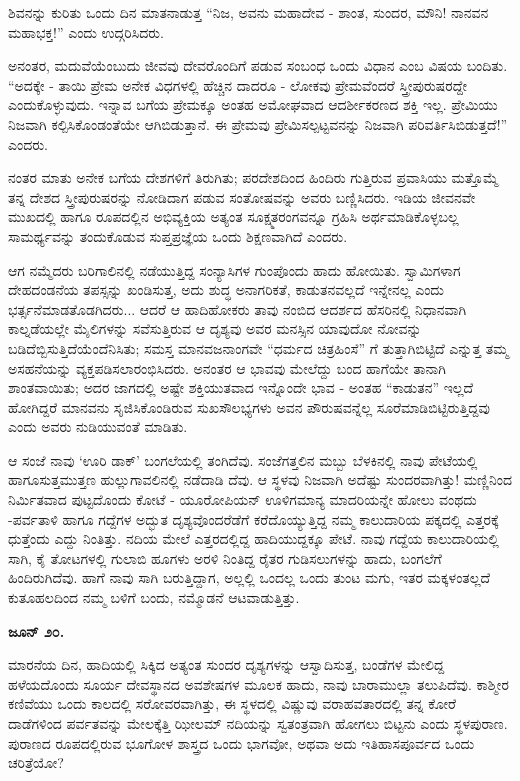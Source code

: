 ಶಿವನನ್ನು ಕುರಿತು ಒಂದು ದಿನ ಮಾತನಾಡುತ್ತ “ನಿಜ, ಅವನು ಮಹಾದೇವ - ಶಾಂತ, ಸುಂದರ, ಮೌನಿ! ನಾನವನ ಮಹಾಭಕ್ತ!” ಎಂದು ಉದ್ಗರಿಸಿದರು.

ಅನಂತರ, ಮದುವೆಯೆಂಬುದು ಜೀವವು ದೇವರೊಂದಿಗೆ ಪಡುವ ಸಂಬಂಧ ಒಂದು ವಿಧಾನ ಎಂಬ ವಿಷಯ ಬಂದಿತು. “ಅದಕ್ಕೇ - ತಾಯಿ ಪ್ರೇಮ ಅನೇಕ ವಿಧಗಳಲ್ಲಿ ಹೆಚ್ಚಿನ ದಾದರೂ - ಲೋಕವು ಪ್ರೇಮವೆಂದರೆ ಸ್ತ್ರೀಪುರುಷರದ್ದೇ ಎಂದುಕೊಳ್ಳುವುದು. ಇನ್ನಾವ ಬಗೆಯ ಪ್ರೇಮಕ್ಕೂ ಅಂತಹ ಅಮೋಘವಾದ ಆದರ್ಶೀಕರಣದ ಶಕ್ತಿ ಇಲ್ಲ. ಪ್ರೇಮಿಯು ನಿಜವಾಗಿ ಕಲ್ಪಿಸಿಕೊಂಡಂತೆಯೇ ಆಗಿಬಿಡುತ್ತಾನೆ. ಈ ಪ್ರೇಮವು ಪ್ರೇಮಿಸಲ್ಪಟ್ಟವನನ್ನು ನಿಜವಾಗಿ ಪರಿವರ್ತಿಸಿಬಿಡುತ್ತದೆ!” ಎಂದರು.

ನಂತರ ಮಾತು ಅನೇಕ ಬಗೆಯ ದೇಶಗಳಿಗೆ ತಿರುಗಿತು; ಪರದೇಶದಿಂದ ಹಿಂದಿರು ಗುತ್ತಿರುವ ಪ್ರವಾಸಿಯು ಮತ್ತೊಮ್ಮೆ ತನ್ನ ದೇಶದ ಸ್ತ್ರೀಪುರುಷರನ್ನು ನೋಡಿದಾಗ ಪಡುವ ಸಂತೋಷವನ್ನು ಅವರು ಬಣ್ಣಿಸಿದರು. ಇಡಿಯ ಜೀವನವೇ ಮುಖದಲ್ಲಿ ಹಾಗೂ ರೂಪದಲ್ಲಿನ ಅಭಿವ್ಯಕ್ತಿಯ ಅತ್ಯಂತ ಸೂಕ್ಷ್ಮತರಂಗವನ್ನೂ ಗ್ರಹಿಸಿ ಅರ್ಥಮಾಡಿಕೊಳ್ಳಬಲ್ಲ ಸಾಮರ್ಥ್ಯವನ್ನು ತಂದುಕೊಡುವ ಸುಪ್ತಪ್ರಜ್ಞೆಯ ಒಂದು ಶಿಕ್ಷಣವಾಗಿದೆ ಎಂದರು.

ಆಗ ನಮ್ಮೆದರು ಬರಿಗಾಲಿನಲ್ಲಿ ನಡೆಯುತ್ತಿದ್ದ ಸಂನ್ಯಾಸಿಗಳ ಗುಂಪೊಂದು ಹಾದು ಹೋಯಿತು. ಸ್ವಾಮಿಗಳಾಗ ದೇಹದಂಡನೆಯ ತಪಸ್ಸನ್ನು ಖಂಡಿಸುತ್ತ, ಅದು ಶುದ್ಧ ಅನಾಗರಿಕತೆ, ಕಾಡುತನವಲ್ಲದೆ ಇನ್ನೇನಲ್ಲ ಎಂದು ಭರ್ತ್ಸನೆಮಾಡತೊಡಗಿದರು... ಆದರೆ ಆ ಹಾದಿಹೋಕರು ತಾವು ನಂಬಿದ ಆದರ್ಶದ ಹೆಸರಿನಲ್ಲಿ ನಿಧಾನವಾಗಿ ಕಾಲ್ನಡೆಯಲ್ಲೇ ಮೈಲಿಗಳನ್ನು ಸವೆಸುತ್ತಿರುವ ಆ ದೃಶ್ಯವು ಅವರ ಮನಸ್ಸಿನ ಯಾವುದೋ ನೋವನ್ನು ಬಡಿದೆಬ್ಬಿಸುತ್ತಿದೆಯೆಂದೆನಿಸಿತು; ಸಮಸ್ತ ಮಾನವಜನಾಂಗವೇ “ಧರ್ಮದ ಚಿತ್ರಹಿಂಸೆ” ಗೆ ತುತ್ತಾಗಿಬಿಟ್ಟಿದೆ ಎನ್ನುತ್ತ ತಮ್ಮ ಅಸಹನೆಯನ್ನು ವ್ಯಕ್ತಪಡಿಸಲಾರಂಭಿಸಿದರು. ಅನಂತರ ಆ ಭಾವವು ಮೇಲೆದ್ದು ಬಂದ ಹಾಗೆಯೇ ತಾನಾಗಿ ಶಾಂತವಾಯಿತು; ಅದರ ಜಾಗದಲ್ಲಿ ಅಷ್ಟೇ ಶಕ್ತಿಯುತವಾದ ಇನ್ನೊಂದೇ ಭಾವ - ಅಂತಹ “ಕಾಡುತನ” ಇಲ್ಲದೆ ಹೋಗಿದ್ದರೆ ಮಾನವನು ಸೃಜಿಸಿಕೊಂಡಿರುವ ಸುಖಸೌಲಭ್ಯಗಳು ಅವನ ಪೌರುಷವನ್ನೆಲ್ಲ ಸೂರೆಮಾಡಿಬಿಟ್ಟಿರುತ್ತಿದ್ದವು ಎಂದು ಅವರು ನುಡಿಯುವಂತೆ ಮಾಡಿತು.

ಆ ಸಂಜೆ ನಾವು ‘ಊರಿ ಡಾಕ್’ ಬಂಗಲೆಯಲ್ಲಿ ತಂಗಿದೆವು. ಸಂಜೆಗತ್ತಲಿನ ಮಬ್ಬು ಬೆಳಕಿನಲ್ಲಿ ನಾವು ಪೇಟೆಯಲ್ಲಿ ಹಾಗೂಸುತ್ತಮುತ್ತಣ ಹುಲ್ಲುಗಾವಲಿನಲ್ಲಿ ನಡೆದಾಡಿ ದೆವು. ಆ ಸ್ಥಳವು ನಿಜವಾಗಿ ಅದೆಷ್ಟು ಸುಂದರವಾಗಿತ್ತು! ಮಣ್ಣಿನಿಂದ ನಿರ್ಮಿತವಾದ ಪುಟ್ಟದೊಂದು ಕೋಟೆ - ಯೂರೋಪಿಯನ್ ಊಳಿಗಮಾನ್ಯ ಮಾದರಿಯನ್ನೇ ಹೋಲು ವಂಥದು -ಪರ್ವತಾಳಿ ಹಾಗೂ ಗದ್ದೆಗಳ ಅದ್ಭುತ ದೃಶ್ಯವೊಂದರೆಡೆಗೆ ಕರೆದೊಯ್ಯುತ್ತಿದ್ದ ನಮ್ಮ ಕಾಲುದಾರಿಯ ಪಕ್ಕದಲ್ಲಿ ಎತ್ತರಕ್ಕೆ ಧುತ್ತೆಂದು ಎದ್ದು ನಿಂತಿತ್ತು. ನದಿಯ ಮೇಲೆ ಎತ್ತರದಲ್ಲಿದ್ದ ಹಾದಿಯುದ್ದಕ್ಕೂ ಪೇಟೆ. ನಾವು ಗದ್ದೆಯ ಕಾಲುದಾರಿಯಲ್ಲಿ ಸಾಗಿ, ಕೈ ತೋಟಗಳಲ್ಲಿ ಗುಲಾಬಿ ಹೂಗಳು ಅರಳಿ ನಿಂತಿದ್ದ ರೈತರ ಗುಡಿಸಲುಗಳನ್ನು ಹಾದು, ಬಂಗಲೆಗೆ ಹಿಂದಿರುಗಿದೆವು. ಹಾಗೆ ನಾವು ಸಾಗಿ ಬರುತ್ತಿದ್ದಾಗ, ಅಲ್ಲಲ್ಲಿ ಒಂದಲ್ಲ ಒಂದು ತುಂಟ ಮಗು, ಇತರ ಮಕ್ಕಳಂತಲ್ಲದೆ ಕುತೂಹಲದಿಂದ ನಮ್ಮ ಬಳಿಗೆ ಬಂದು, ನಮ್ಮೊಡನೆ ಆಟವಾಡುತ್ತಿತ್ತು.

\textbf{ಜೂನ್ ೨೦.}

ಮಾರನೆಯ ದಿನ, ಹಾದಿಯಲ್ಲಿ ಸಿಕ್ಕಿದ ಅತ್ಯಂತ ಸುಂದರ ದೃಶ್ಯಗಳನ್ನು ಆಸ್ವಾದಿಸುತ್ತ, ಬಂಡೆಗಳ ಮೇಲಿದ್ದ ಹಳೆಯದೊಂದು ಸೂರ್ಯ ದೇವಸ್ಥಾನದ ಅವಶೇಷಗಳ ಮೂಲಕ ಹಾದು, ನಾವು ಬಾರಾಮುಲ್ಲಾ ತಲುಪಿದೆವು. ಕಾಶ್ಮೀರ ಕಣಿವೆಯು ಒಂದು ಕಾಲದಲ್ಲಿ ಸರೋವರವಾಗಿತ್ತು, ಈ ಸ್ಥಳದಲ್ಲಿ ವಿಷ್ಣುವು ವರಾಹವತಾರದಲ್ಲಿ ತನ್ನ ಕೋರೆ ದಾಡೆಗಳಿಂದ ಪರ್ವತವನ್ನು ಮೇಲಕ್ಕೆತ್ತಿ ಝೀಲಮ್​ ನದಿಯನ್ನು ಸ್ವತಂತ್ರವಾಗಿ ಹೋಗಲು ಬಿಟ್ಟನು ಎಂದು ಸ್ಥಳಪುರಾಣ. ಪುರಾಣದ ರೂಪದಲ್ಲಿರುವ ಭೂಗೋಳ ಶಾಸ್ತ್ರದ ಒಂದು ಭಾಗವೋ, ಅಥವಾ ಅದು ಇತಿಹಾಸಪೂರ್ವದ ಒಂದು ಚರಿತ್ರೆಯೋ?

